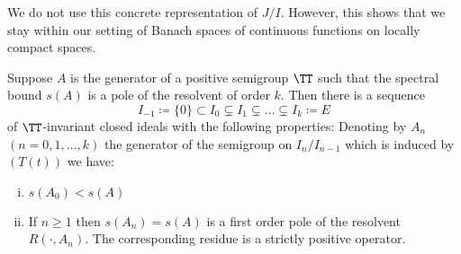 We do not use this concrete representation of $J/I$.
However, this shows that we stay within our setting of Banach spaces of continuous functions on locally compact spaces.
\begin{lemma}\label{lem:b3-2.8}
Suppose $A$ is the generator of a positive semigroup $\TT$ such that the spectral bound $s(A)$ is a pole of the resolvent of order $k$.
	Then there is a sequence
	\begin{equation}\label{eq:b3-2.16}
		I_{-1} \coloneqq \{0\} \subset I_{0} \subsetneq I_{1} \subsetneq \ldots \subsetneq I_{k} \coloneqq E
	\end{equation}
	of $\TT$-invariant closed ideals with the following properties: 
Denoting by $A_{n}$ $(n = 0,1,\ldots,k)$ the generator of the semigroup on $I_{n}/I_{n-1}$ which is induced by $(T(t))$ we have:
	\begin{enumerate}[(i)]
		\item 
		$s(A_{0}) < s(A)$
		
		\item 
		If $n \geq 1$ then $s(A_{n}) = s(A)$ is a first order pole of the resolvent $R(\cdot,A_{n})$. The corresponding residue is a strictly positive operator.
	\end{enumerate}
\end{lemma}
%	

